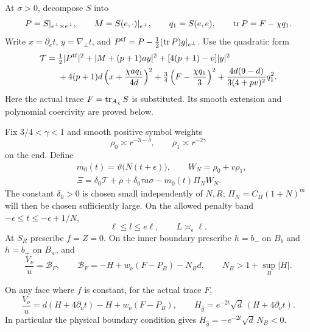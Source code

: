 At \(\sigma>0\), decompose \(S\) into
\[
 P=S|_{e^\perp\times e^\perp},\qquad
 M=S(e,\cdot)|_{e^\perp},\qquad q_1=S(e,e),\qquad
 \operatorname{tr} P=F-\chi q_1 .
\]
Write \(x=\partial_e t\), \(y=\nabla_\perp t\), and
\(P^{\mathrm{tf}}=P-\frac12(\operatorname{tr} P)g|_{e^\perp}\).
Use the quadratic form
\begin{align}
\label{eq:fl-quadratic-form}
 \mathcal T={}&
 \tfrac12\lvert P^{\mathrm{tf}}\rvert^2
 +\lvert M+(p+1)ay\rvert^2+[4(p+1)-v]\lvert y\rvert^2 \notag\\
 &+4(p+1)d\left(x+\frac{\chi a q_1}{4d}\right)^2
 +\tfrac34\left(F-\frac{\chi q_1}{3}\right)^2
 +\frac{4d(9-d)}{3(4+pv)^2}q_1^2 .
\end{align}
Here the actual trace \(F=\operatorname{tr}_{A_\chi}S\) is substituted.  Its smooth
extension and polynomial coercivity are proved below.

Fix \(3/4<\gamma<1\) and smooth positive symbol weights
\begin{equation}
\label{eq:fl-weights}
 \rho_0\asymp r^{-3-\delta},\qquad \rho_1\asymp r^{-2\gamma}
\end{equation}
on the end.  Define
\begin{equation}
\label{eq:fl-source}
\begin{aligned}
 &m_0(t)=\vartheta\bigl(N(t+\epsilon)\bigr),\qquad
 W_N=\rho_0+v\rho_1,\\
 &\Xi=\delta_0\mathcal T+\rho+\delta_0\tau a\sigma
                  -m_0(t)\Pi_NW_N .
\end{aligned}
\end{equation}
The constant \(\delta_0>0\) is chosen small independently of \(N,R\);
\(\Pi_N=C_\Pi(1+N)^m\) will then be chosen sufficiently large.
On the allowed penalty band
\(-\epsilon\le t\le-\epsilon+1/N\),
\[
 \ell\le l\le e\ell,\qquad L\asymp_\epsilon\ell .
\]
At \(S_R\) prescribe \(f=Z=0\).
On the inner boundary prescribe \(h=b_-\) on \(B_b\) and \(h=b_+\)
on \(B_w\), and
\begin{equation}
\label{eq:fl-boundary}
 \frac{V_\nu}{u}=\mathcal B_F,\qquad
 \mathcal B_F=-H+w_\nu(F-P_B)-N_Bd,\qquad
 N_B>1+\sup_B\lvert H\rvert .
\end{equation}



\begin{lemma}
\label{lem:fl-boundary-identity}
On any face where \(f\) is constant, for the actual trace \(F\),
\begin{equation}
\label{eq:fl-boundary-identity}
 \frac{V_\nu}{u}
 =d(H+4\partial_\nu t)-H+w_\nu(F-P_B),\qquad
 H_{\hat g}=e^{-2t}\sqrt d\,(H+4\partial_\nu t).
\end{equation}
In particular the physical boundary condition gives
\(H_{\hat g}=-e^{-2t}\sqrt d\,N_B<0\).
\end{lemma}

